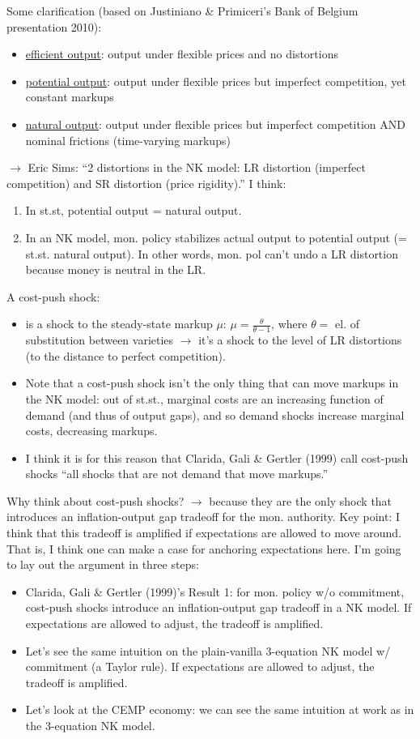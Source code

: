 \documentclass[11pt]{article}
\renewcommand{\[}{\begin{equation}}
\renewcommand{\]}{\end{equation}}
\begin{document}
Some clarification (based on Justiniano \& Primiceri's Bank of Belgium presentation 2010):
\begin{itemize}
\item \underline{efficient output}: output under flexible prices and no distortions
\item \underline{potential output}: output under flexible prices but imperfect competition, yet constant markups
\item \underline{natural output}: output under flexible prices but imperfect competition AND nominal frictions (time-varying markups)
\end{itemize}
$\rightarrow$ Eric Sims: ``2 distortions in the NK model: LR distortion (imperfect competition) and SR distortion (price rigidity).''
I think:
\begin{enumerate}
\item In st.st, potential output = natural output. 
\item In an NK model, mon. policy stabilizes actual output to potential output (= st.st. natural output). In other words, mon. pol can't undo a LR distortion because money is neutral in the LR.
\end{enumerate}
A cost-push shock:
\begin{itemize}
\item is a shock to the steady-state markup $\mu$: $\mu = \frac{\theta}{\theta-1}$, where $\theta =$ el. of substitution between varieties $\rightarrow$ it's a shock to the level of LR distortions (to the distance to perfect competition).
\item Note that a cost-push shock isn't the only thing that can move markups in the NK model: out of st.st., marginal costs are an increasing function of demand (and thus of output gaps), and so demand shocks increase marginal costs, decreasing markups.
\item I think it is for this reason that Clarida, Gali \& Gertler (1999) call cost-push shocks ``all shocks that are not demand that move markups.''
\end{itemize}
Why think about cost-push shocks? $\rightarrow$ because they are the only shock that introduces an inflation-output gap tradeoff for the mon. authority. Key point: I think that this tradeoff is amplified if expectations are allowed to move around. That is, I think one can make a case for anchoring expectations here. I'm going to lay out the argument in three steps:
\begin{itemize}
\item Clarida, Gali \& Gertler (1999)'s Result 1: for mon. policy w/o commitment, cost-push shocks introduce an inflation-output gap tradeoff in a NK model. If expectations are allowed to adjust, the tradeoff is amplified.
\item Let's see the same intuition on the plain-vanilla 3-equation NK model w/ commitment (a Taylor rule). If expectations are allowed to adjust, the tradeoff is amplified.
\item Let's look at the CEMP economy: we can see the same intuition at work as in the 3-equation NK model.
\end{itemize}
\end{document}
